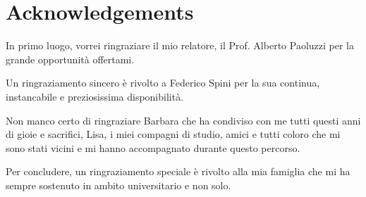 \chapter{Acknowledgements}
\label{cha:acknowledgements}

In primo luogo, vorrei ringraziare il mio relatore, il Prof. Alberto Paoluzzi per la grande opportunità offertami.

Un ringraziamento sincero è rivolto a Federico Spini per la sua continua, instancabile e preziosissima disponibilità.

Non manco certo di ringraziare Barbara che ha condiviso con me tutti questi anni di gioie e sacrifici, Lisa, i miei compagni di studio, amici e tutti coloro che mi sono stati vicini e mi hanno accompagnato durante questo percorso.

Per concludere, un ringraziamento speciale è rivolto alla mia famiglia che mi ha sempre sostenuto in ambito universitario e non solo.


